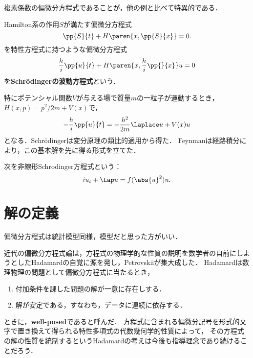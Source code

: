\documentclass[uplatex,dvipdfmx]{jsreport}
\begin{document}
\begin{tcolorbox}[colframe=ForestGreen, colback=ForestGreen!10!white,breakable,colbacktitle=ForestGreen!40!white,coltitle=black,fonttitle=\bfseries\sffamily,
title=]
    複素係数の偏微分方程式であることが，他の例と比べて特異的である．
\end{tcolorbox}

\begin{model}
    Hamilton系の作用$S$が満たす偏微分方程式
    \[\pp{S}{t}+H\paren{x,\pp{S}{x}}=0.\]
    を特性方程式に持つような偏微分方程式
    \[\frac{h}{i}\pp{u}{t}+H\paren{x,\frac{h}{i}\pp{}{x}}u=0\]
    を\textbf{Schrödingerの波動方程式}という．
\end{model}

\begin{example}
    特にポテンシャル関数$V$が与える場で質量$m$の一粒子が運動するとき，$H(x,p)=p^2/2m+V(x)$で，
    \[-\frac{h}{i}\pp{u}{t}=-\frac{h^2}{2m}\Laplace u+V(x)u\]
    となる．Schrödingerは変分原理の類比的適用から得た．
    Feynmanは経路積分により，この基本解を先に得る形式を立てた．
\end{example}

\begin{model}
    次を非線形Schrodinger方程式という：
    \[iu_t+\Lap u=f(\abs{u}^2)u.\]
\end{model}

\section{解の定義}

\begin{tcolorbox}[colframe=ForestGreen, colback=ForestGreen!10!white,breakable,colbacktitle=ForestGreen!40!white,coltitle=black,fonttitle=\bfseries\sffamily,
title=]
    偏微分方程式は統計模型同様，模型だと思った方がいい．
\end{tcolorbox}

\begin{history}
    近代の偏微分方程式論は，方程式の物理学的な性質の説明を数学者の自前にしようとしたHadamardの自覚に源を発し，Petrovskiiが集大成した．
    Hadamardは数理物理の問題として偏微分方程式に当たるとき，
    \begin{enumerate}
        \item 付加条件を課した問題の解が一意に存在しする．
        \item 解が安定である，すなわち，データに連続に依存する．
    \end{enumerate}
    ときに，\textbf{well-posed}であると呼んだ．
    方程式に含まれる偏微分記号を形式的文字で置き換えて得られる特性多項式の代数幾何学的性質によって，
    その方程式の解の性質を統制するというHadamardの考えは今後も指導理念であり続けることだろう．
\end{history}
\end{document}
